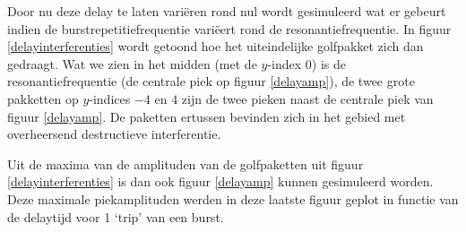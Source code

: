 Door nu deze delay te laten vari\"eren rond nul wordt gesimuleerd wat er 
gebeurt indien de burstrepetitiefrequentie vari\"eert rond de 
resonantiefrequentie. In figuur \ref{delayinterferenties} wordt getoond hoe 
het uiteindelijke golfpakket zich dan gedraagt. Wat we zien in het midden 
(met de $y$-index 0) is de resonantiefrequentie (de centrale piek op figuur 
\ref{delayamp}), de twee grote pakketten op $y$-indices $-4$ en $4$ zijn de 
twee pieken naast de centrale piek van figuur \ref{delayamp}. De paketten 
ertussen bevinden zich in het gebied met overheersend destructieve 
interferentie.

Uit de maxima van de amplituden van de golfpaketten uit figuur 
\ref{delayinterferenties} is dan ook figuur \ref{delayamp} kunnen 
gesimuleerd worden. Deze maximale piekamplituden werden in deze laatste 
figuur geplot in functie van de delaytijd voor 1 `trip' van een burst.





